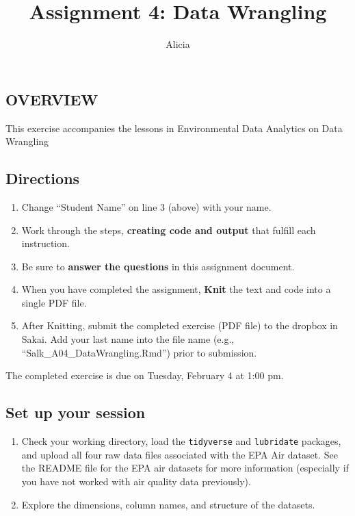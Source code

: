 \documentclass[]{article}
\title{Assignment 4: Data Wrangling}
\author{Alicia}
\date{}
\providecommand{\tightlist}{%
  \setlength{\itemsep}{0pt}\setlength{\parskip}{0pt}}
\begin{document}
\maketitle

\hypertarget{overview}{%
\subsection{OVERVIEW}\label{overview}}

This exercise accompanies the lessons in Environmental Data Analytics on
Data Wrangling

\hypertarget{directions}{%
\subsection{Directions}\label{directions}}

\begin{enumerate}
\def\labelenumi{\arabic{enumi}.}
\tightlist
\item
  Change ``Student Name'' on line 3 (above) with your name.
\item
  Work through the steps, \textbf{creating code and output} that fulfill
  each instruction.
\item
  Be sure to \textbf{answer the questions} in this assignment document.
\item
  When you have completed the assignment, \textbf{Knit} the text and
  code into a single PDF file.
\item
  After Knitting, submit the completed exercise (PDF file) to the
  dropbox in Sakai. Add your last name into the file name (e.g.,
  ``Salk\_A04\_DataWrangling.Rmd'') prior to submission.
\end{enumerate}

The completed exercise is due on Tuesday, February 4 at 1:00 pm.

\hypertarget{set-up-your-session}{%
\subsection{Set up your session}\label{set-up-your-session}}

\begin{enumerate}
\def\labelenumi{\arabic{enumi}.}
\item
  Check your working directory, load the \texttt{tidyverse} and
  \texttt{lubridate} packages, and upload all four raw data files
  associated with the EPA Air dataset. See the README file for the EPA
  air datasets for more information (especially if you have not worked
  with air quality data previously).
\item
  Explore the dimensions, column names, and structure of the datasets.
\end{enumerate}
\end{document}
